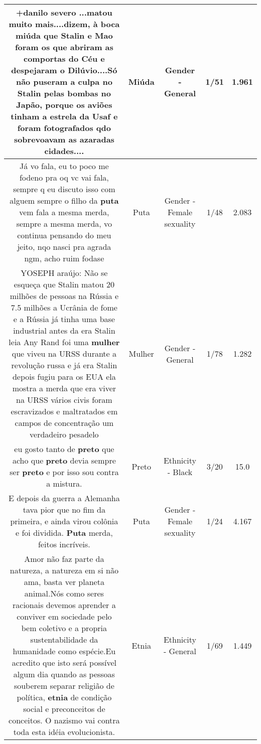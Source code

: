 \documentclass[11pt]{article}
\newlength\mylength
\begin{document}
\begin{center}
\begin{longtable}{|C{.65\mylength}|C{.30\mylength}|C{.12\mylength}|C{.12\mylength}|C{.12\mylength}|}
  \small +danilo severo ...matou muito mais....dizem, à boca \textbf{miúda} que Stalin e Mao foram os que abriram as comportas do Céu e despejaram o Dilúvio....Só não puseram a culpa no Stalin pelas bombas no Japão, porque os aviões tinham a estrela da Usaf e foram fotografados qdo sobrevoavam as azaradas cidades....\normalsize   & Miúda & Gender - General & 1/51 & 1.961 \\  \hline
  \small Já vo fala, eu to poco me fodeno pra oq vc vai fala, sempre q eu discuto isso com alguem sempre o filho da \textbf{puta} vem fala a mesma merda, sempre a mesma merda, vo continua pensando do meu jeito,  nqo nasci pra agrada ngm, acho ruim fodase\normalsize   & Puta & Gender - Female sexuality & 1/48 & 2.083 \\  \hline
  \small YOSEPH araújo: Não se esqueça que Stalin matou 20 milhões de pessoas na Rússia e 7.5 milhões a Ucrânia de fome e a Rússia já tinha uma base industrial antes da era Stalin leia Any Rand foi uma \textbf{mulher} que viveu na URSS durante a revolução russa e já era Stalin depois fugiu para os EUA ela mostra a merda que era viver na URSS vários civis foram escravizados e maltratados em campos de concentração um verdadeiro pesadelo\normalsize   & Mulher & Gender - General & 1/78 & 1.282 \\  \hline
  \small eu gosto tanto de \textbf{preto} que acho que \textbf{preto} devia sempre ser \textbf{preto} e por isso sou contra a mistura.\normalsize   & Preto & Ethnicity - Black & 3/20 & 15.0 \\  \hline
  \small E depois da guerra a Alemanha tava pior que no fim da primeira, e ainda virou colônia e foi dividida. \textbf{Puta} merda, feitos incríveis.\normalsize   & Puta & Gender - Female sexuality & 1/24 & 4.167 \\  \hline
  \small Amor não faz parte da natureza, a natureza em si não ama, basta ver planeta animal.Nós como seres racionais devemos aprender a conviver em sociedade pelo bem coletivo e a propria sustentabilidade da humanidade como espécie.Eu acredito que isto será possível algum dia quando as pessoas souberem separar religião de política, \textbf{etnia} de condição social e preconceitos de conceitos. O nazismo vai contra toda esta idéia evolucionista.\normalsize   & Etnia & Ethnicity - General & 1/69 & 1.449 \\  \hline

\end{longtable}
\end{center}
\end{document}
